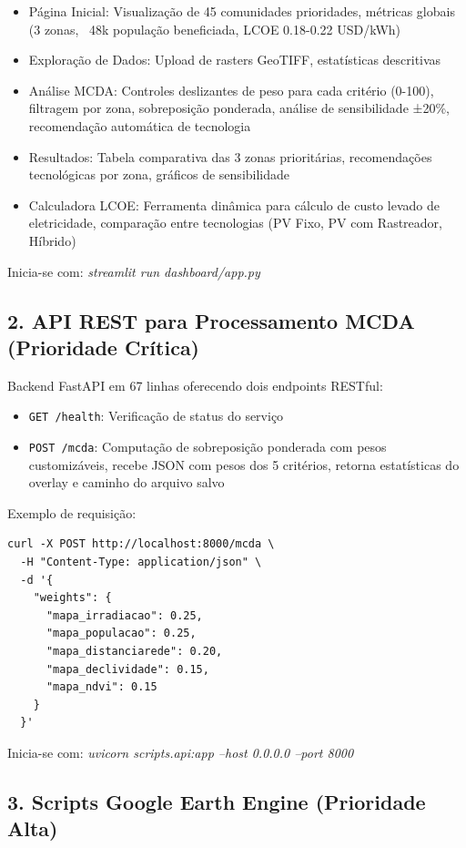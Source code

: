 \documentclass[12pt, a4paper]{article}
\begin{document}
\begin{itemize}
    \item Página Inicial: Visualização de 45 comunidades prioridades, métricas globais (3 zonas, ~48k população beneficiada, LCOE 0.18-0.22 USD/kWh)
    \item Exploração de Dados: Upload de rasters GeoTIFF, estatísticas descritivas
    \item Análise MCDA: Controles deslizantes de peso para cada critério (0-100), filtragem por zona, sobreposição ponderada, análise de sensibilidade ±20\%, recomendação automática de tecnologia
    \item Resultados: Tabela comparativa das 3 zonas prioritárias, recomendações tecnológicas por zona, gráficos de sensibilidade
    \item Calculadora LCOE: Ferramenta dinâmica para cálculo de custo levado de eletricidade, comparação entre tecnologias (PV Fixo, PV com Rastreador, Híbrido)
\end{itemize}

Inicia-se com: \textit{streamlit run dashboard/app.py}

\subsection{2. API REST para Processamento MCDA (Prioridade Crítica)}

Backend FastAPI em 67 linhas oferecendo dois endpoints RESTful:

\begin{itemize}
    \item \texttt{GET /health}: Verificação de status do serviço
    \item \texttt{POST /mcda}: Computação de sobreposição ponderada com pesos customizáveis, recebe JSON com pesos dos 5 critérios, retorna estatísticas do overlay e caminho do arquivo salvo
\end{itemize}

Exemplo de requisição:
\begin{verbatim}
curl -X POST http://localhost:8000/mcda \
  -H "Content-Type: application/json" \
  -d '{
    "weights": {
      "mapa_irradiacao": 0.25,
      "mapa_populacao": 0.25,
      "mapa_distanciarede": 0.20,
      "mapa_declividade": 0.15,
      "mapa_ndvi": 0.15
    }
  }'
\end{verbatim}

Inicia-se com: \textit{uvicorn scripts.api:app --host 0.0.0.0 --port 8000}

\subsection{3. Scripts Google Earth Engine (Prioridade Alta)}
\end{document}
